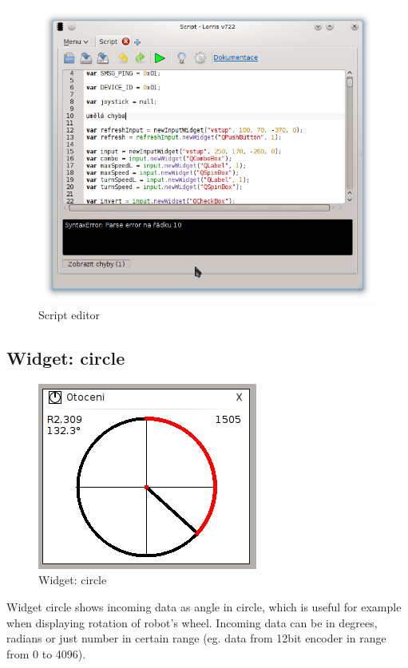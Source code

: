 \documentclass[12pt, a4paper, oneside]{article}
\begin{document}
\begin{figure}[h]
\begin{center}
\includegraphics[width=\textwidth]{img/w_script_src.png}
\caption{Script editor}
\label{script_src}
\end{center}
\end{figure}

\subsection{Widget: circle}
\begin{figure}[H]
\begin{center}
\includegraphics[scale=0.8]{img/w_circle.png}
\caption{Widget: circle}
\end{center}
\end{figure}
Widget circle shows incoming data as angle in circle, which is useful for example when displaying rotation of robot's wheel. Incoming data can be in degrees, radians or just number in certain range (eg. data from 12bit encoder in range from 0 to 4096).
\end{document}
